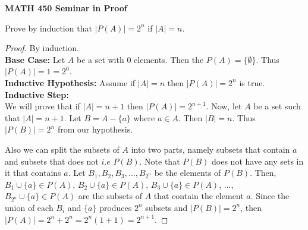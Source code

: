 \documentclass[14pt]{article}
\begin{document}
\begin{center}
		
{\bf MATH 450 Seminar in Proof}
 \\
\end{center}
	Prove by induction that $|P(A)| = 2^n$ if $|A| = n$.\\
\begin{proof}
	 By induction. \\
	
	\textbf{Base Case:} Let $A$ be a set with 0 elements. Then the $P(A) = \{ \emptyset \}$. Thus $|P(A)| = 1 = 2^0$.\\
	\textbf{Inductive Hypothesis:} Assume if $|A| = n$ then $|P(A)| = 2^n$ is true.
	\textbf{Inductive Step:}
	\\ We will prove that if $|A| = n+1$ then $|P(A)| = 2^{n+1}$. Now, let $A$ be a set such that $|A| = n+1$. Let $B = A - \{a\}$ where $a \in A$. Then $|B| = n$. Thus $|P(B)| = 2^n$ from our hypothesis.
	
	 Also we can split the subsets of $A$ into two parts, namely subsets that contain $a$ and subsets that does not $i.e$ $P(B)$. Note that $P(B)$ does not have any sets in it that contains $a$. Let $B_1, B_2, B_3,...,B_{2^n}$ be the elements of $P(B)$. Then, $B_1 \cup \{a\} \in P(A)$, $B_2 \cup \{a\} \in P(A)$, $B_3 \cup \{a\} \in P(A)$, ..., $B_{2^n} \cup \{a\} \in P(A)$ are the subsets of $A$ that contain the element $a$. Since the union of each $B_i$ and $\{a\}$ produces $2^n$ subsets and $|P(B)| =2^n$, then $|P(A)| = 2^n + 2^n = 2^n(1+1) = 2^{n+1}$. 
\end{proof}
\end{document}

